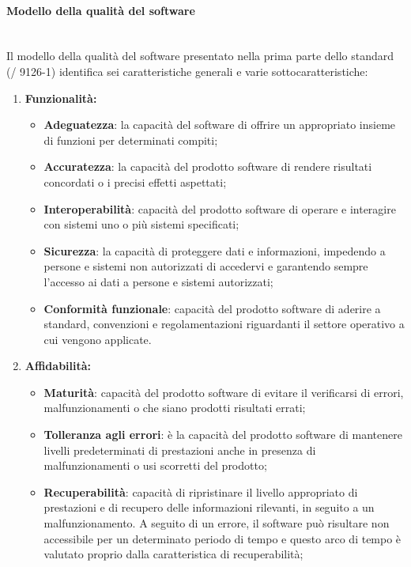   \paragraph{Modello della qualità del software}\\
  Il modello della qualità del software presentato nella prima parte dello standard (/ 9126-1) identifica sei caratteristiche generali e varie sottocaratteristiche:
  \begin{enumerate}
    \item \textbf{Funzionalità:}
    \begin{itemize}
        \item \textbf{Adeguatezza}: la capacità del software di offrire un appropriato insieme di funzioni per determinati compiti;
        \item \textbf{Accuratezza}: la capacità del prodotto software di rendere risultati concordati o i precisi effetti aspettati;
        \item \textbf{Interoperabilità}: capacità del prodotto software di operare e interagire con sistemi uno o più sistemi specificati;
        \item \textbf{Sicurezza}: la capacità di proteggere dati e informazioni, impedendo a persone e sistemi non autorizzati di accedervi e garantendo sempre l'accesso ai dati a persone e sistemi autorizzati;
        \item \textbf{Conformità funzionale}: capacità del prodotto software di aderire a standard, convenzioni e regolamentazioni riguardanti il settore operativo a cui vengono applicate.
    \end{itemize}
    \item \textbf{Affidabilità:}
    \begin{itemize}
      \item \textbf{Maturità}: capacità del prodotto software di evitare il verificarsi di errori, malfunzionamenti o che siano prodotti risultati errati;
      \item \textbf{Tolleranza agli errori}: è la capacità del prodotto software di mantenere livelli predeterminati di prestazioni anche in presenza di malfunzionamenti o usi scorretti del prodotto;
      \item \textbf{Recuperabilità}: capacità di ripristinare il livello appropriato di prestazioni e di recupero delle informazioni rilevanti, in seguito a un malfunzionamento.
      A seguito di un errore, il software può risultare non accessibile per un determinato periodo di tempo e questo arco di tempo è valutato proprio dalla caratteristica di recuperabilità;

\end{itemize}
\end{enumerate}
